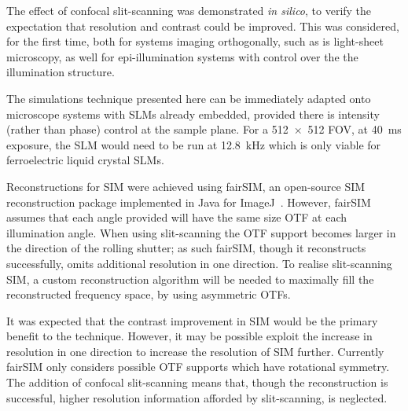 The effect of confocal \gls{slit-scanning} was demonstrated \emph{in silico}, to verify the expectation that resolution and contrast could be improved. %
This was considered, for the first time, both for systems imaging orthogonally, such as is light-sheet microscopy, as well for epi-illumination systems with control over the the illumination structure.

The simulations technique presented here can be immediately adapted onto microscope systems with \gls{SLM}s already embedded, provided there is intensity (rather than phase) control at the sample plane.
For a \SI{512x512}{} \gls{FOV}, at \SI{40}{\milli\second} exposure, the \gls{SLM} would need to be run at \SI{12.8}{\kilo\hertz} which is only viable for ferroelectric liquid crystal \gls{SLM}s.

Reconstructions for \gls{SIM} were achieved using fairSIM, an open-source \gls{SIM} reconstruction package implemented in Java for ImageJ~\cite{mullerOpensourceImageReconstruction2016a}.
However, fairSIM assumes that each angle provided will have the same size \gls{OTF} at each illumination angle.
When using \gls{slit-scanning} the \gls{OTF} support becomes larger in the direction of the rolling shutter; as such fairSIM, though it reconstructs successfully, omits additional resolution in one direction.
To realise \gls{slit-scanning} \gls{SIM}, a custom reconstruction algorithm will be needed to maximally fill the reconstructed frequency space, by using asymmetric \gls{OTF}s.

It was expected that the contrast improvement in \gls{SIM} would be the primary benefit to the technique.
However, it may be possible exploit the increase in resolution in one direction to increase the resolution of \gls{SIM} further.
Currently fairSIM only considers possible \gls{OTF} supports which have rotational symmetry.
The addition of confocal \gls{slit-scanning} means that, though the reconstruction is successful, higher resolution information afforded by \gls{slit-scanning}, is neglected.

